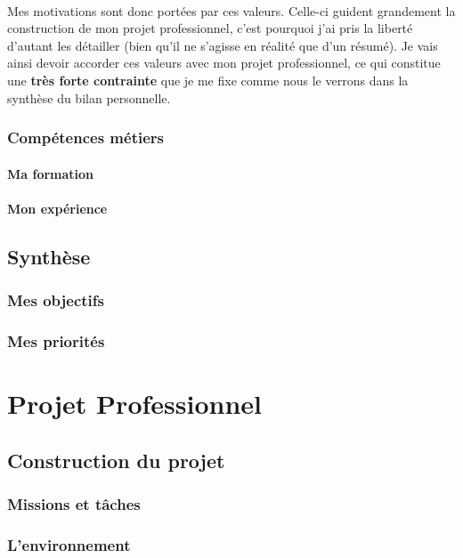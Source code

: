 \documentclass[a4paper,12pt, draft]{report}
\begin{document}
\paragraph{}
Mes motivations sont donc portées par ces valeurs. Celle-ci guident grandement la construction de mon projet professionnel, c'est pourquoi j'ai pris la liberté d'autant les détailler (bien qu'il ne s'agisse en réalité que d'un résumé).
Je vais ainsi devoir accorder ces valeurs avec mon projet professionnel, ce qui constitue une \textbf{très forte contrainte} que je me fixe comme nous le verrons dans la synthèse du bilan personnelle.

\section{Compétences métiers} 
\subsection{Ma formation}
\subsection{Mon expérience}

\chapter{Synthèse}
\section{Mes objectifs}
\section{Mes priorités}

\part{Projet Professionnel}

\chapter{Construction du projet} 
\section{Missions et tâches}
\section{L'environnement}
\end{document}
